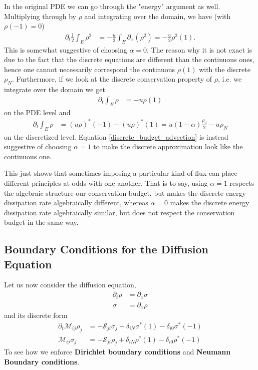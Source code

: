 \documentclass{report}
\numberwithin{equation}{section}
\begin{document}
In the original PDE we can go through the "energy" argument as well. Multiplying through by $\rho$ and integrating over the domain, we have (with $\rho(-1) = 0$)
\begin{align}
\partial_t \frac{1}{2} \int_E \rho^2  &= - \frac{u}{2} \int_E \partial_x\left( \rho^2 \right)  
= - \frac{u}{2} \rho^2(1).
\end{align}
This is somewhat suggestive of choosing $\alpha = 0$. The reason why it is not exact is due to the fact that the discrete equations are different than the continuous ones, hence one cannot necessarily correspond the continuous $\rho(1)$ with the discrete $\rho_N$. Furthermore, if we look at the discrete conservation property of $\rho$, i.e. we integrate over the domain we get 
\begin{align}
\partial_t \int_E \rho &= - u \rho(1)
\end{align}
on the PDE level and 
\begin{align}
\label{discrete_budget_advection}
 \partial_t  \int_E \rho  &= (u \rho)^*(-1) - (u \rho)^*(1) = u (1-\alpha)\frac{\rho_0}{2} - u \rho_N
\end{align}
on the discretized level. Equation \ref{discrete_budget_advection} is instead suggestive of choosing $\alpha = 1$ to make the discrete approximation look like the continuous one. 

This just shows that sometimes imposing a particular kind of flux can place different principles at odds with one another. That is to say, using $\alpha = 1$ respects the algebraic structure our conservation budget, but makes the discrete energy dissipation rate algebraically different, whereas $\alpha = 0$ makes the discrete energy dissipation rate algebraically similar, but does not respect the conservation budget in the same way. 

\subsection{Boundary Conditions for the Diffusion Equation}
\label{diffusion_equations_bc}
Let us now consider the diffusion equation,
\begin{align}
    \partial_t \rho &= \partial_x \sigma \\
    \sigma &= \partial_x \rho
\end{align}
and its discrete form
\begin{align}
    \label{diff_discrete_form_1}
    \partial_t \mathcal{M}_{ij} \rho_j &= 
    - \mathcal{S}_{ji}\sigma_{j}
    + \delta_{iN} \sigma^*(1) 
    - \delta_{i0} \sigma^*(-1)
    \\
    \label{diff_discrete_form_2}
    \mathcal{M}_{ij} \sigma_j &= -  \mathcal{S}_{ji} \rho_j 
    + \delta_{iN}\rho^*(1) 
    -
    \delta_{i0} \rho^*(-1)
\end{align}
To see how we enforce \textbf{Dirichlet boundary conditions} and \textbf{Neumann Boundary conditions}. 
\end{document}
